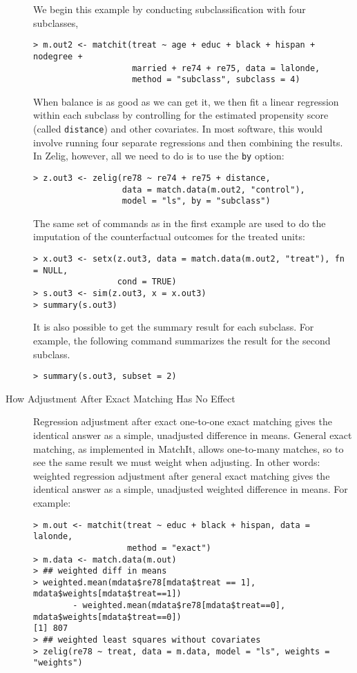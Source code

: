 \begin{description}
  We begin this example by conducting subclassification with four
  subclasses,
\begin{verbatim}
> m.out2 <- matchit(treat ~ age + educ + black + hispan + nodegree + 
                    married + re74 + re75, data = lalonde, 
                    method = "subclass", subclass = 4)
\end{verbatim}
  When balance is as good as we can get it, we then fit a linear
  regression within each subclass by controlling for the estimated
  propensity score (called \texttt{distance}) and other covariates.
  In most software, this would involve running four separate
  regressions and then combining the results.  In Zelig, however, all
  we need to do is to use the {\tt by} option:
\begin{verbatim}
> z.out3 <- zelig(re78 ~ re74 + re75 + distance, 
                  data = match.data(m.out2, "control"), 
                  model = "ls", by = "subclass")
\end{verbatim}
  The same set of commands as in the first example are used to do the
  imputation of the counterfactual outcomes for the treated units:
\begin{verbatim}
> x.out3 <- setx(z.out3, data = match.data(m.out2, "treat"), fn = NULL, 
                 cond = TRUE)
> s.out3 <- sim(z.out3, x = x.out3)
> summary(s.out3)
\end{verbatim}
It is also possible to get the summary result for each subclass. For
example, the following command summarizes the result for the second
subclass.
\begin{verbatim}
> summary(s.out3, subset = 2)
\end{verbatim}
  
\item[How Adjustment After Exact Matching Has No Effect] Regression 
adjustment after exact one-to-one exact matching gives the identical 
answer as a simple, unadjusted difference in means.  General exact 
matching, as implemented in MatchIt, allows one-to-many matches, so to see 
the same result we must weight when adjusting.  In other words: weighted 
regression adjustment after general exact matching gives the identical 
answer as a simple, unadjusted weighted difference in means.  For 
example:

\begin{verbatim}
> m.out <- matchit(treat ~ educ + black + hispan, data = lalonde, 
                   method = "exact")
> m.data <- match.data(m.out)
> ## weighted diff in means 
> weighted.mean(mdata$re78[mdata$treat == 1], mdata$weights[mdata$treat==1]) 
        - weighted.mean(mdata$re78[mdata$treat==0], mdata$weights[mdata$treat==0])
[1] 807
> ## weighted least squares without covariates
> zelig(re78 ~ treat, data = m.data, model = "ls", weights = "weights")


\end{verbatim}
\end{description}
